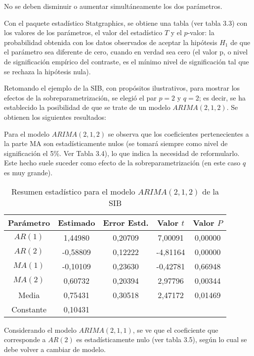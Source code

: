 \begin{observacion}
No se deben disminuir o aumentar simult\'{a}neamente los dos par\'{a}metros. 
\end{observacion}

Con el paquete estad\'{i}stico Statgraphics, se obtiene una tabla (ver tabla 3.3) con los valores de los par\'{a}metros, el valor del estad\'{i}stico $T$ y el $p$-valor: la probabilidad obtenida con los datos observados de aceptar la hip\'{o}tesis $H_{1}$ de que el par\'{a}metro sea diferente de cero, cuando en verdad sea cero (el valor p, o nivel de significaci\'{o}n emp\'{i}rico del contraste, es el m\'{i}nimo nivel de significaci\'{o}n tal que se rechaza la hip\'{o}tesis nula).

\begin{ejemplo}
Retomando el ejemplo de la SIB, con prop\'{o}sitos ilustrativos, para mostrar los efectos de la sobreparametrizaci\'{o}n, se elegi\'{o} el par $p=2$ y $q=2$; es decir, se ha establecido la posibilidad de que se trate de un modelo $ARIMA(2,1,2)$. Se obtienen los siguientes resultados:\newline

Para el modelo $ARIMA(2,1,2)$ se observa que los coeficientes pertenecientes a la parte MA son estad\'{i}sticamente nulos (se tomar\'{a} siempre como nivel de significaci\'{o}n el 5{\%}. Ver Tabla 3.4), lo que indica la necesidad de reformularlo. Este hecho suele suceder como efecto de la sobreparametrizaci\'{o}n (en este caso $q$ es muy grande). 

\begin{table}[H]
\centering
\begin{tabular}{@{}ccccc@{}}\hline
Par\'{a}metro & Estimado & Error Estd. & Valor $t$ & Valor $P$ \\ \hline
$AR(1)$ & 1,44980& 0,20709& 7,00091& 0,00000 \\
$AR(2)$ & -0,58809& 0,12222& -4,81164& 0,00000 \\
$MA(1)$ & -0,10109& 0,23630& -0,42781& 0,66948 \\
$MA(2)$ & 0,60732& 0,20394& 2,97796& 0,00344 \\
Media & 0,75431& 0,30518& 2,47172& 0,01469 \\
Constante& 0,10431& & &  \\ \hline
\end{tabular}
\caption{Resumen estad\'{i}stico para el modelo $ARIMA(2,1,2)$ de la SIB}
\end{table}

Considerando el modelo $ARIMA(2,1,1)$, se ve que el coeficiente que corresponde a $AR(2)$ es estad\'{i}sticamente nulo (ver tabla 3.5), seg\'{u}n lo cual se debe volver a cambiar de modelo.


\end{ejemplo}
